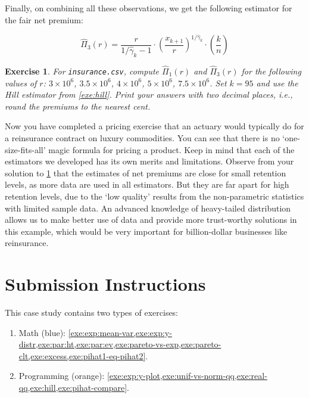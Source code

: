 \documentclass[12pt]{article}
\newcommand*{\Pihat}{\widehat{\Pi}}
\newcommand*{\gammahat}{\widehat{\gamma}}
\newtheorem{exercise}{Exercise}[section]
\begin{document}
Finally, on combining all these observations, we get the following estimator for
the fair net premium:

\begin{tcolorbox}[myres]
\begin{equation}
\label{eq:pihat3}
\Pihat_3(r) = \frac{r}{1/\gammahat_k - 1}
    \cdot\left(\frac{x_{k+1}}{r}\right)^{1/\gammahat_k}
    \cdot\left(\frac{k}{n}\right)
\end{equation}
\end{tcolorbox}

\begin{tcolorbox}[progExe]
\begin{exercise}
\label{exe:pihat-compare}
For \texttt{insurance.csv},
compute $\Pihat_1(r)$ and $\Pihat_3(r)$ for the following values of $r$:
$3 \times 10^6$,
$3.5 \times 10^6$,
$4 \times 10^6$,
$5 \times 10^6$,
$7.5 \times 10^6$.
Set $k=95$ and use the Hill estimator from \cref{exe:hill}.
Print your answers with two decimal places, i.e.,
round the premiums to the nearest cent.
\end{exercise}
\end{tcolorbox}

Now you have completed a pricing exercise that an actuary would typically do for a
reinsurance contract on luxury commodities.
You can see that there is no `one-size-fits-all' magic formula for pricing a product.
Keep in mind that each of the estimators we developed has its own merits and limitations.
Observe from your solution to \cref{exe:pihat-compare} that
the estimates of net premiums are close for small retention levels,
as more data are used in all estimators.
But they are far apart for high retention levels, due to the `low quality' results
from the non-parametric statistics with limited sample data.
An advanced knowledge of heavy-tailed distribution allows us to make better use of data
and provide more trust-worthy solutions in this example,
which would be very important for billion-dollar businesses like reinsurance.

\bibPrep{}  %


\newpage
\appendix

\section{Submission Instructions}

This case study contains two types of exercises:
\begin{enumerate}
\item Math (blue): \cref{exe:exp:mean-var,exe:exp:y-distr,exe:par:ht,exe:par:ev,exe:pareto-vs-exp,exe:pareto-clt,exe:excess,exe:pihat1-eq-pihat2}.
\item Programming (orange): \cref{exe:exp:y-plot,exe:unif-vs-norm-qq,exe:real-qq,exe:hill,exe:pihat-compare}.
\end{enumerate}
\end{document}
